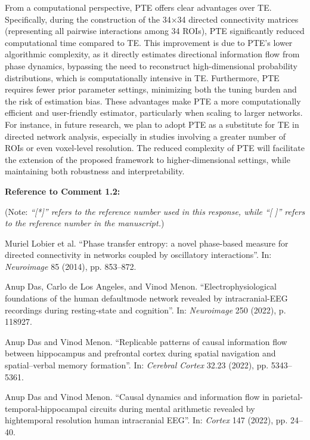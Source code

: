 \documentclass[12pt,technote,onecolumn]{IEEEtran}
\begin{document}
From a computational perspective, PTE offers clear advantages over TE. Specifically, during the construction of the 34×34 directed connectivity matrices (representing all pairwise interactions among 34 ROIs), PTE significantly reduced computational time compared to TE. This improvement is due to PTE's lower algorithmic complexity, as it directly estimates directional information flow from phase dynamics, bypassing the need to reconstruct high-dimensional probability distributions, which is computationally intensive in TE. Furthermore, PTE requires fewer prior parameter settings, minimizing both the tuning burden and the risk of estimation bias.
These advantages make PTE a more computationally efficient and user-friendly estimator, particularly when scaling to larger networks. For instance, in future research, we plan to adopt PTE as a substitute for TE in directed network analysis, especially in studies involving a greater number of ROIs or even voxel-level resolution. The reduced complexity of PTE will facilitate the extension of the proposed framework to higher-dimensional settings, while maintaining both robustness and interpretability.

\vspace{1mm}

\noindent \textbf{Reference to Comment 1.2:} 

\noindent(Note: \textit{``[*]'' refers to the reference number used in this response, while ``[ ]'' refers to the reference number in the manuscript.})

\noindent[46]\:Muriel Lobier et al. ``Phase transfer entropy: a novel
phase-based measure for directed connectivity in networks
coupled by oscillatory interactions”. In: \textit{Neuroimage} 85 (2014), pp. 853–872.

\noindent[48]\:Anup Das, Carlo de Los Angeles, and Vinod Menon. ``Electrophysiological foundations of the human defaultmode
network revealed by intracranial-EEG recordings during resting-state and cognition”. In: \textit{Neuroimage} 250 (2022), p. 118927.

\noindent[49]\:Anup Das and Vinod Menon. ``Replicable patterns of causal information flow between hippocampus and prefrontal cortex during spatial navigation and spatial–verbal memory formation”. In: \textit{Cerebral Cortex} 32.23 (2022), pp. 5343–5361.

\noindent[50]\:Anup Das and Vinod Menon. ``Causal dynamics and information flow in parietal-temporal-hippocampal
circuits during mental arithmetic revealed by hightemporal
resolution human intracranial EEG”. In: \textit{Cortex} 147 (2022), pp. 24–40.
\end{document}
